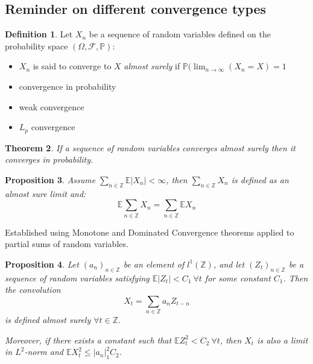 \documentclass[12pt]{article}
\newtheorem{theorem}{Theorem}[section]
\newtheorem{proposition}[theorem]{Proposition}
\theoremstyle{definition}
\newtheorem{definition}[theorem]{Definition}
\theoremstyle{remark}
\numberwithin{equation}{section}
\newcommand{\PP}{\mathbb{P}}
\newcommand{\ZZ}{\mathbb{Z}}
\newcommand{\EE}{\mathbb{E}}
\begin{document}
\subsection{Reminder on different convergence types}
\begin{definition}
	Let $X_n$ be a sequence of random variables defined on the probability space $\left(\Omega, \mathcal{F}, \PP\right)$:
	\begin{itemize}
		\item $X_n$ is said to converge to $X$ \emph{almost surely} if $\PP(\lim_{n\rightarrow \infty}(X_n = X) = 1$
		\item convergence in probability
		\item weak convergence
		\item $L_p$ convergence
	\end{itemize}
\end{definition}

\begin{theorem}
	If a sequence of random variables converges almost surely then it converges in probability.
\end{theorem}

\begin{proposition}
	Assume $\sum_{n\in\ZZ}\EE|X_n| < \infty$, then $\sum_{n\in\ZZ}X_n$ is defined as an almost sure limit and:
	\begin{equation*}
		\EE\sum_{n\in\ZZ}X_n = \sum_{n\in\ZZ}\EE X_n
	\end{equation*}
\end{proposition}
\proof Established using Monotone and Dominated Convergence theorems applied to partial sums of random variables.

\begin{proposition}
	Let $(a_n)_{n\in\ZZ}$ be an element of $l^1(\ZZ)$, and let $(Z_t)_{n\in\ZZ}$ be a sequence of random variables satisfying $\EE |Z_t| < C_1\ \forall t$ for some constant $C_1$. Then the convolution
	\begin{equation*}
		X_t = \sum_{n\in\ZZ}a_nZ_{t-n}
	\end{equation*}
	is defined almost surely $\forall t\in \ZZ$.

	Moreover, if there exists a constant such that $\EE Z_t^2 < C_2\ \forall t$, then $X_t$ is also a limit in $L^2$-norm and $\EE X_t^2\leq |a_n|_1^2C_2$.
\end{proposition}
\end{document}
